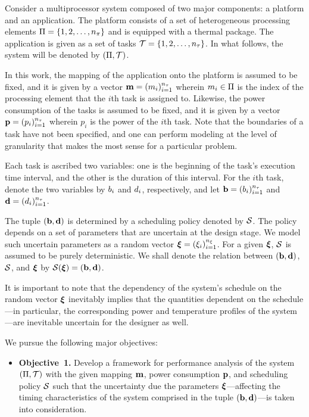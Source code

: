 Consider a multiprocessor system composed of two major components: a platform
and an application. The platform consists of a set of heterogeneous processing
elements $\Pi = \{ 1, 2, \dots, {n_\pi} \}$ and is equipped with a thermal
package. The application is given as a set of tasks $\mathcal{T} = \{ 1, 2, \dots,
{n_\tau} \}$. In what follows, the system will be denoted by $(\Pi, \mathcal{T})$.

In this work, the mapping of the application onto the platform is assumed to be
fixed, and it is given by a vector $\mathbf{m} = (m_i)_{i = 1}^{{n_\tau}}$ wherein $m_i
\in \Pi$ is the index of the processing element that the $i$th task is
assigned to. Likewise, the power consumption of the tasks is assumed to be
fixed, and it is given by a vector $\mathbf{p} = (p_i)_{i = 1}^{{n_\tau}}$ wherein $p_i$
is the power of the $i$th task. Note that the boundaries of a task have not been
specified, and one can perform modeling at the level of granularity that makes
the most sense for a particular problem.

Each task is ascribed two variables: one is the beginning of the task's
execution time interval, and the other is the duration of this interval. For the
$i$th task, denote the two variables by $b_i$ and $d_i$, respectively, and let
$\mathbf{b} = (b_i)_{i=1}^{{n_\tau}}$ and $\mathbf{d} = (d_i)_{i=1}^{{n_\tau}}$.

The tuple $(\mathbf{b}, \mathbf{d})$ is determined by a scheduling policy denoted by
$\mathcal{S}$. The policy depends on a set of parameters that are uncertain at the
design stage. We model such uncertain parameters as a random vector $\bm{\xi} =
(\xi_i)_{i = 1}^{n_\xi}$. For a given $\bm{\xi}$, $\mathcal{S}$ is assumed to be purely
deterministic. We shall denote the relation between $(\mathbf{b}, \mathbf{d})$, $\mathcal{S}$,
and $\bm{\xi}$ by $\mathcal{S}(\bm{\xi}) = (\mathbf{b}, \mathbf{d})$.

It is important to note that the dependency of the system's schedule on the
random vector $\bm{\xi}$ inevitably implies that the quantities dependent on the
schedule---in particular, the corresponding power and temperature profiles of
the system---are inevitable uncertain for the designer as well.

We pursue the following major objectives:
\begin{itemize}

\item {\bfseries Objective~1.} Develop a framework for performance analysis of
  the system $(\Pi, \mathcal{T})$ with the given mapping $\mathbf{m}$, power
  consumption $\mathbf{p}$, and scheduling policy $\mathcal{S}$ such that the
  uncertainty due the parameters $\bm{\xi}$---affecting the timing characteristics of
  the system comprised in the tuple $(\mathbf{b}, \mathbf{d})$---is taken into consideration.

\end{itemize}
